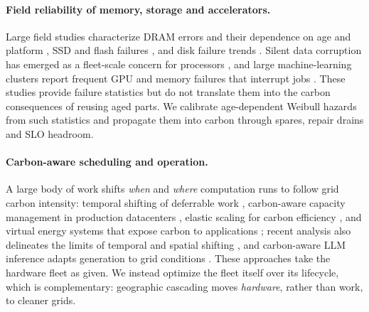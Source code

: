 \documentclass[11pt]{article}
\begin{document}
\paragraph{Field reliability of memory, storage and accelerators.}
Large field studies characterize DRAM errors and their dependence on age and platform \citep{schroeder2009dram,sridharan2012dram,sridharan2015memory,meza2015dram,zivanovic2019dram,dramicdcs2024}, SSD and flash failures \citep{meza2015flash,schroeder2016flash,ssdsystor2016,ssdnas2024}, and disk failure trends \citep{pinheiro2007disk}. Silent data corruption has emerged as a fleet-scale concern for processors \citep{hochschild2021cores,dixit2021sdc,sdctaco2024}, and large machine-learning clusters report frequent GPU and memory failures that interrupt jobs \citep{llama3,kokolis2025reliability}. These studies provide failure statistics but do not translate them into the carbon consequences of reusing aged parts. We calibrate age-dependent Weibull hazards from such statistics and propagate them into carbon through spares, repair drains and SLO headroom.

\paragraph{Carbon-aware scheduling and operation.}
A large body of work shifts \emph{when} and \emph{where} computation runs to follow grid carbon intensity: temporal shifting of deferrable work \citep{wiesner2021letswait}, carbon-aware capacity management in production datacenters \citep{radovanovic2023cics}, elastic scaling for carbon efficiency \citep{hanafy2024carbonscaler}, and virtual energy systems that expose carbon to applications \citep{souza2023ecovisor}; recent analysis also delineates the limits of temporal and spatial shifting \citep{sukprasert2024limitations}, and carbon-aware LLM inference adapts generation to grid conditions \citep{li2024sprout}. These approaches take the hardware fleet as given. We instead optimize the fleet itself over its lifecycle, which is complementary: geographic cascading moves \emph{hardware}, rather than work, to cleaner grids.
\end{document}
